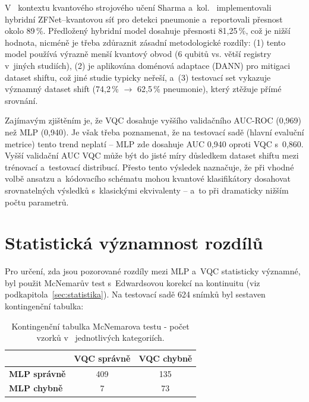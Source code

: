 \documentclass[12pt, a4paper]{report}
\begin{document}
V ~kontextu kvantového strojového učení Sharma a~kol.~\cite{pneumonia_detection_qml} implementovali hybridní ZFNet--kvantovou síť pro detekci pneumonie a~reportovali přesnost okolo 89\,\%. Předložený hybridní model dosahuje přesnosti 81{,}25\,\%, což je nižší hodnota, nicméně je třeba zdůraznit zásadní metodologické rozdíly: (1) tento model používá výrazně menší kvantový obvod (6 qubitů vs. větší registry v~jiných studiích), (2) je aplikována doménová adaptace (DANN) pro mitigaci dataset shiftu, což jiné studie typicky neřeší, a~(3) testovací set vykazuje významný dataset shift (74{,}2\,\% $\to$ 62{,}5\,\% pneumonie), který ztěžuje přímé srovnání.

Zajímavým zjištěním je, že VQC dosahuje vyššího validačního AUC-ROC (0{,}969) než MLP (0{,}940). Je však třeba poznamenat, že na testovací sadě (hlavní evaluční metrice) tento trend neplatí -- MLP zde dosahuje AUC 0{,}940 oproti VQC s~0{,}860. Vyšší validační AUC VQC může být do jisté míry důsledkem dataset shiftu mezi trénovací a~testovací distribucí. Přesto tento výsledek naznačuje, že při vhodné volbě ansatzu a~kódovacího schématu mohou kvantové klasifikátory dosahovat srovnatelných výsledků s~klasickými ekvivalenty -- a~to při dramaticky nižším počtu parametrů.

\section{Statistická významnost rozdílů}
\label{sec:statisticka_vyznamnost}

Pro určení, zda jsou pozorované rozdíly mezi MLP a~VQC statisticky významné, byl použit McNemarův test s~Edwardsovou korekcí na kontinuitu (viz podkapitola~\ref{sec:statistika}). Na testovací sadě 624 snímků byl sestaven kontingenční tabulka:

\begin{table}[htbp]
    \centering
    \caption{Kontingenční tabulka McNemarova testu - počet vzorků v ~jednotlivých kategoriích.}
    \label{tab:mcnemar_contingency}
    \begin{tabular}{|l|c|c|}
        \hline
        & \textbf{VQC správně} & \textbf{VQC chybně} \\
        \hline
        \textbf{MLP správně} & 409 & 135 \\
        \hline
        \textbf{MLP chybně} & 7 & 73 \\
        \hline
    \end{tabular}
\end{table}
\end{document}
